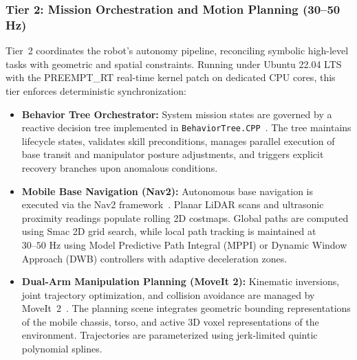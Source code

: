 \subsubsection{Tier 2: Mission Orchestration and Motion Planning (30--50 Hz)}
Tier~2 coordinates the robot's autonomy pipeline, reconciling symbolic high-level tasks with geometric and spatial constraints. Running under Ubuntu 22.04 LTS with the PREEMPT\_RT real-time kernel patch on dedicated CPU cores, this tier enforces deterministic synchronization:
\begin{itemize}[leftmargin=1.5em]
  \item \textbf{Behavior Tree Orchestrator:} System mission states are governed by a reactive decision tree implemented in \texttt{BehaviorTree.CPP}~\cite{behaviortrees}. The tree maintains lifecycle states, validates skill preconditions, manages parallel execution of base transit and manipulator posture adjustments, and triggers explicit recovery branches upon anomalous conditions.
  \item \textbf{Mobile Base Navigation (Nav2):} Autonomous base navigation is executed via the Nav2 framework~\cite{nav2}. Planar LiDAR scans and ultrasonic proximity readings populate rolling 2D costmaps. Global paths are computed using Smac 2D grid search, while local path tracking is maintained at $30\text{--}50\text{ Hz}$ using Model Predictive Path Integral (MPPI) or Dynamic Window Approach (DWB) controllers with adaptive deceleration zones.
  \item \textbf{Dual-Arm Manipulation Planning (MoveIt 2):} Kinematic inversions, joint trajectory optimization, and collision avoidance are managed by MoveIt~2~\cite{moveit2}. The planning scene integrates geometric bounding representations of the mobile chassis, torso, and active 3D voxel representations of the environment. Trajectories are parameterized using jerk-limited quintic polynomial splines.
\end{itemize}

